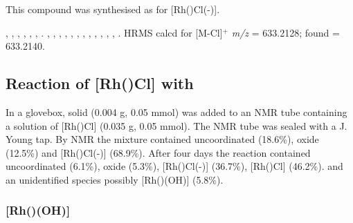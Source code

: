 
This compound was synthesised as for [Rh(\tBusixantphos)Cl(-)].

,
,
,
,
,
,
.
,
,
,
,
,
,
,
,
,
,
,
,
.
HRMS calcd for  [M-Cl]$^+$ \emph{m/z} = 633.2128; found = 633.2140.

\subsection*{Reaction of [Rh(\tBusixantphos)Cl] with \texorpdfstring{} O}


In a glovebox, solid  (0.004 g, 0.05 mmol) was added to an NMR tube containing a  solution of [Rh(\tBusixantphos)Cl] (0.035 g, 0.05 mmol).  The NMR tube was sealed with a J. Young tap.  By \phosphorus{} NMR the mixture contained uncoordinated \tBusixantphos{} (18.6\%), \tBusixantphos{} oxide (12.5\%) and [Rh(\tBusixantphos)Cl(-)] (68.9\%).  After four days the reaction contained uncoordinated \tBusixantphos{} (6.1\%), \tBusixantphos{} oxide (5.3\%), [Rh(\tBusixantphos)Cl(-)] (36.7\%),  [Rh(\tBusixantphos)Cl] (46.2\%). and an unidentified species possibly [Rh(\tBusixantphos)(OH)] (5.8\%).

\subsubsection{[Rh(\tBusixantphos)(OH)]}


